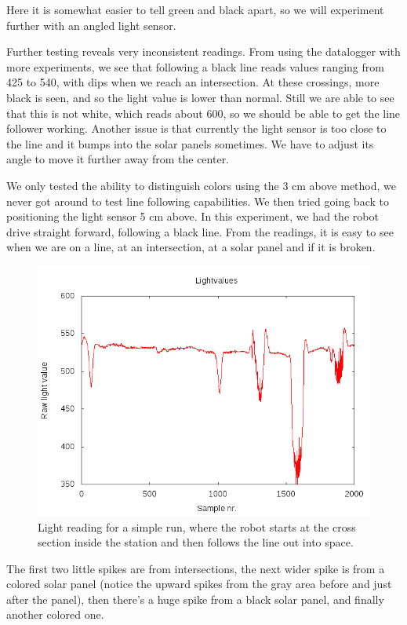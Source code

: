 Here
it is somewhat easier to tell green and black apart, so we will
experiment further with an angled light sensor.

Further testing reveals very inconsistent readings. From using the
datalogger with more experiments, we see that following a black line
reads values ranging from 425 to 540, with dips when we reach an
intersection. At these crossings, more black is seen, and so the light
value is lower than normal. Still we are able to see that this is not
white, which reads about 600, so we should be able to get the line
follower working. Another issue is that currently the light sensor is
too close to the line and it bumps into the solar panels sometimes. We
have to adjust its angle to move it further away from the center.

We only tested the ability to distinguish colors using the 3 cm above
method, we never got around to test line following capabilities. We then
tried going back to positioning the light sensor 5 cm above. In this
experiment, we had the robot drive straight forward, following a black
line. From the readings, it is easy to see when we are on a line, at an
intersection, at a solar panel and if it is
broken.
\begin{figure}[hbt]
  \centering
  \includegraphics[scale=0.5]{../experiments/1prototype/results/gnuplot/GridAccuracyFollowBlack3cm.png}
  \caption{Light reading for a simple run, where the robot starts at the cross section inside the station and then follows the line out into space.}
\end{figure}

The
first two little spikes are from intersections, the next wider spike is
from a colored solar panel (notice the upward spikes from the gray area
before and just after the panel), then there's a huge spike from a black
solar panel, and finally another colored one.

